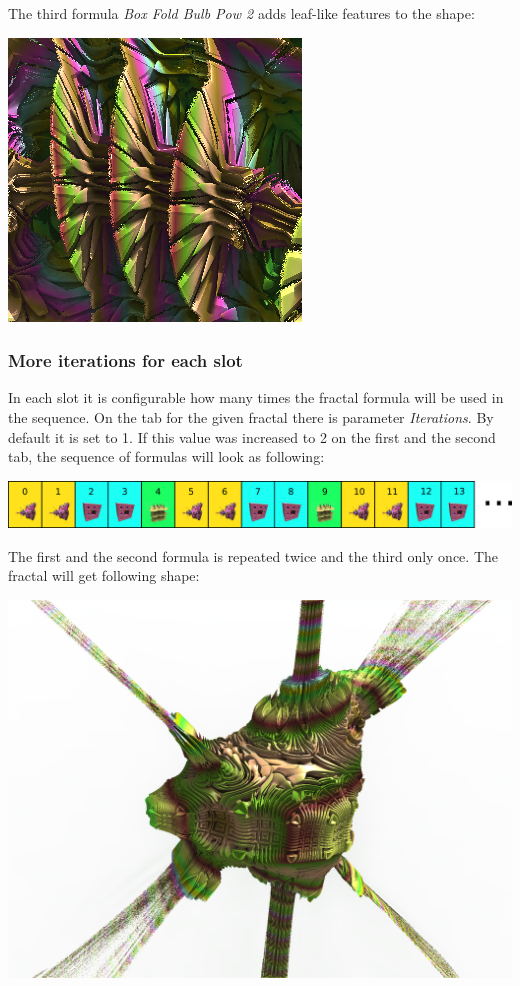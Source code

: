 The third formula \emph{Box Fold Bulb Pow 2} adds leaf-like features to the shape:

\includegraphics[width=0.4\linewidth]{img/manual/media/hybrid_sequence_example_1_leaf_shapes.png}

\subsubsection{More iterations for each slot}

In each slot it is configurable how many times the fractal formula will be used in the sequence.
On the tab for the given fractal there is parameter \emph{Iterations}.
By default it is set to 1. If this value was increased to 2 on the first and the second tab,
the sequence of formulas will look as following:\label{two-iterations-per-slot}

\includegraphics[width=\linewidth]{img/manual/media/iteration_loop_hybrid_sequence_2.png}

The first and the second formula is repeated twice and the third only once.
The fractal will get following shape:

\includegraphics[width=0.7\linewidth]{img/manual/media/hybrid_sequence_example_2.png}

